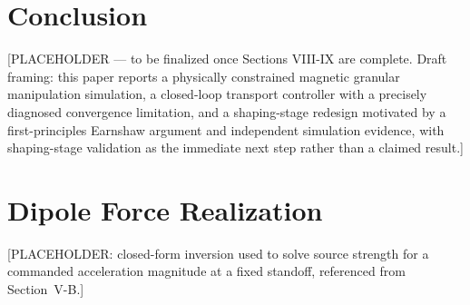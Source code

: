 \documentclass[journal]{IEEEtran}
\begin{document}
\section{Conclusion}
[PLACEHOLDER --- to be finalized once Sections VIII-IX are complete. Draft
framing: this paper reports a physically constrained magnetic granular
manipulation simulation, a closed-loop transport controller with a
precisely diagnosed convergence limitation, and a shaping-stage redesign
motivated by a first-principles Earnshaw argument and independent
simulation evidence, with shaping-stage validation as the immediate next
step rather than a claimed result.]

\appendices
\section{Dipole Force Realization}
[PLACEHOLDER: closed-form inversion used to solve source strength for a
commanded acceleration magnitude at a fixed standoff, referenced from
Section~V-B.]

\end{document}
